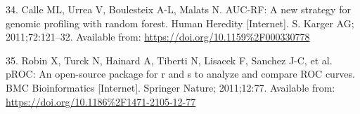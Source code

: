 \documentclass[12pt,]{article}
\begin{document}
\hypertarget{ref-Calle_2011}{}
34. Calle ML, Urrea V, Boulesteix A-L, Malats N. AUC-RF: A new strategy
for genomic profiling with random forest. Human Heredity {[}Internet{]}.
S. Karger AG; 2011;72:121--32. Available from:
\url{https://doi.org/10.1159\%2F000330778}

\hypertarget{ref-Robin_2011}{}
35. Robin X, Turck N, Hainard A, Tiberti N, Lisacek F, Sanchez J-C, et
al. pROC: An open-source package for r and s to analyze and compare ROC
curves. BMC Bioinformatics {[}Internet{]}. Springer Nature; 2011;12:77.
Available from: \url{https://doi.org/10.1186\%2F1471-2105-12-77}
\end{document}
